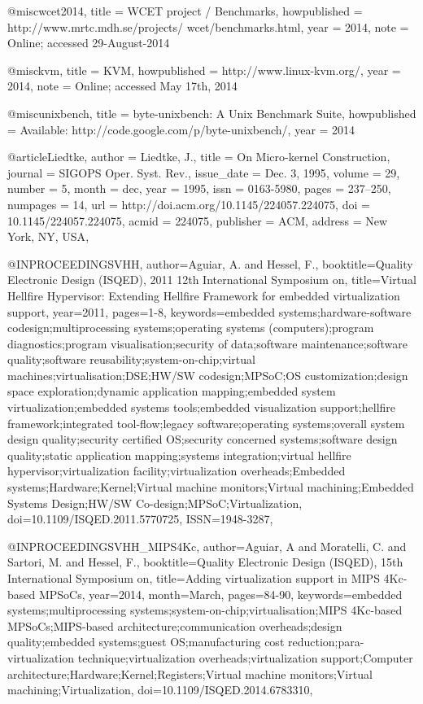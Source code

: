 @misc{wcet2014,
  title = {WCET project / Benchmarks},
  howpublished = {http://www.mrtc.mdh.se/projects/ wcet/benchmarks.html},
  year = {2014}, 
  note = {Online; accessed 29-August-2014}
}

@misc{kvm,
  title = {KVM},
  howpublished = {http://www.linux-kvm.org/},
  year = {2014}, 
  note = {Online; accessed May 17th, 2014}
}

@misc{unixbench,
  title = {byte-unixbench: A Unix Benchmark Suite},
  howpublished = {Available: http://code.google.com/p/byte-unixbench/},
  year = {2014}
}

@article{Liedtke,
 author = {Liedtke, J.},
 title = {On Micro-kernel Construction},
 journal = {SIGOPS Oper. Syst. Rev.},
 issue_date = {Dec. 3, 1995},
 volume = {29},
 number = {5},
 month = dec,
 year = {1995},
 issn = {0163-5980},
 pages = {237--250},
 numpages = {14},
 url = {http://doi.acm.org/10.1145/224057.224075},
 doi = {10.1145/224057.224075},
 acmid = {224075},
 publisher = {ACM},
 address = {New York, NY, USA},
} 

@INPROCEEDINGS{VHH,
author={Aguiar, A. and Hessel, F.},
booktitle={Quality Electronic Design (ISQED), 2011 12th International Symposium on},
title={Virtual Hellfire Hypervisor: Extending Hellfire Framework for embedded virtualization support},
year={2011},
pages={1-8},
keywords={embedded systems;hardware-software codesign;multiprocessing systems;operating systems (computers);program diagnostics;program visualisation;security of data;software maintenance;software quality;software reusability;system-on-chip;virtual machines;virtualisation;DSE;HW/SW codesign;MPSoC;OS customization;design space exploration;dynamic application mapping;embedded system virtualization;embedded systems tools;embedded visualization support;hellfire framework;integrated tool-flow;legacy software;operating systems;overall system design quality;security certified OS;security concerned systems;software design quality;static application mapping;systems integration;virtual hellfire hypervisor;virtualization facility;virtualization overheads;Embedded systems;Hardware;Kernel;Virtual machine monitors;Virtual machining;Embedded Systems Design;HW/SW Co-design;MPSoC;Virtualization},
doi={10.1109/ISQED.2011.5770725},
ISSN={1948-3287},}

@INPROCEEDINGS{VHH_MIPS4Kc, 
author={Aguiar, A and Moratelli, C. and Sartori, M. and Hessel, F.}, 
booktitle={Quality Electronic Design (ISQED), 15th International Symposium on}, 
title={Adding virtualization support in MIPS 4Kc-based MPSoCs}, 
year={2014}, 
month={March}, 
pages={84-90}, 
keywords={embedded systems;multiprocessing systems;system-on-chip;virtualisation;MIPS 4Kc-based MPSoCs;MIPS-based architecture;communication overheads;design quality;embedded systems;guest OS;manufacturing cost reduction;para-virtualization technique;virtualization overheads;virtualization support;Computer architecture;Hardware;Kernel;Registers;Virtual machine monitors;Virtual machining;Virtualization}, 
doi={10.1109/ISQED.2014.6783310},}

